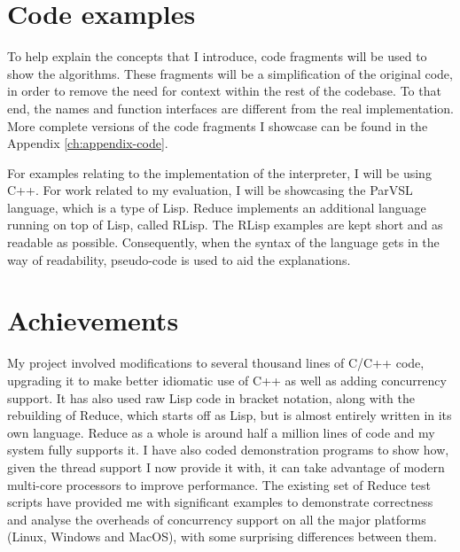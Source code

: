 \section{Code examples}

To help explain the concepts that I introduce, code fragments will be used to show the algorithms.
These fragments will be a simplification of the original code, in order to remove the need
for context within the rest of the codebase. To that end, the names and function interfaces
are different from the real implementation. More complete versions of the code fragments
I showcase can be found in the Appendix \ref{ch:appendix-code}.

For examples relating to the implementation of the interpreter, I will be using C++.
For work related to my evaluation, I will be showcasing the ParVSL language, which is a type
of Lisp. Reduce implements an additional language running on top of Lisp, called RLisp.
The RLisp examples are kept short and as readable as possible.
Consequently, when the syntax of the language gets in the way of readability,
pseudo-code is used to aid the explanations.

\section{Achievements}
\label{sec:achievements}

My project involved modifications to several thousand lines of C/C++ code, upgrading it to
make better idiomatic use of C++ as well as adding concurrency support. It has also used raw
Lisp code in bracket notation, along with the rebuilding of Reduce, which starts off as Lisp,
but is almost entirely written in its own language. Reduce as a whole is around half a million
lines of code and my system fully supports it. I have also coded demonstration programs to
show how, given the thread support I now provide it with, it can take advantage of modern
multi-core processors to improve performance. The existing set of Reduce test scripts have provided me
with significant examples to demonstrate correctness and analyse the overheads of
concurrency support on all the major platforms (Linux, Windows and MacOS), with some surprising
differences between them.